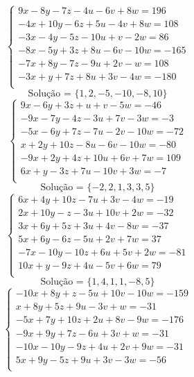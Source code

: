 \documentclass[12pt,oneside,a4paper]{article}
\begin{document}
\vspace{\baselineskip}
\begin{equation*}
\begin{cases}
9x-8y-7z-4u-6v+8w=196 \\
-4x+10y-6z+5u-4v+8w=108 \\
-3x-4y-5z-10u+v-2w=86 \\
-8x-5y+3z+8u-6v-10w=-165 \\
-7x+8y-7z-9u+2v-w=108 \\
-3x+y+7z+8u+3v-4w=-180 \\
\end{cases}
\end{equation*}
\begin{equation*}
\text{Solução = }\{1,2,-5,-10,-8,10\}
\end{equation*}
\vspace{\baselineskip}
\begin{equation*}
\begin{cases}
9x-6y+3z+u+v-5w=-46 \\
-9x-7y-4z-3u+7v-3w=-3 \\
-5x-6y+7z-7u-2v-10w=-72 \\
x+2y+10z-8u-6v-10w=-80 \\
-9x+2y+4z+10u+6v+7w=109 \\
6x+y-3z+7u-10v+3w=-7 \\
\end{cases}
\end{equation*}
\begin{equation*}
\text{Solução = }\{-2,2,1,3,3,5\}
\end{equation*}
\vspace{\baselineskip}
\begin{equation*}
\begin{cases}
6x+4y+10z-7u+3v-4w=-19 \\
2x+10y-z-3u+10v+2w=-32 \\
3x+6y+5z+3u+4v-8w=-37 \\
5x+6y-6z-5u+2v+7w=37 \\
-7x-10y-10z+6u+5v+2w=-81 \\
10x+y-9z+4u-5v+6w=79 \\
\end{cases}
\end{equation*}
\begin{equation*}
\text{Solução = }\{1,4,1,1,-8,5\}
\end{equation*}
\vspace{\baselineskip}
\begin{equation*}
\begin{cases}
-10x+8y+z-5u+10v-10w=-159 \\
x+8y+5z+9u-3v+w=-31 \\
-5x+7y+10z+2u+8v-9w=-176 \\
-9x+9y+7z-6u+3v+w=-31 \\
-10x-10y-9z+4u+2v+9w=-31 \\
5x+9y-5z+9u+3v-3w=-56 \\
\end{cases}
\end{equation*}
\end{document}
